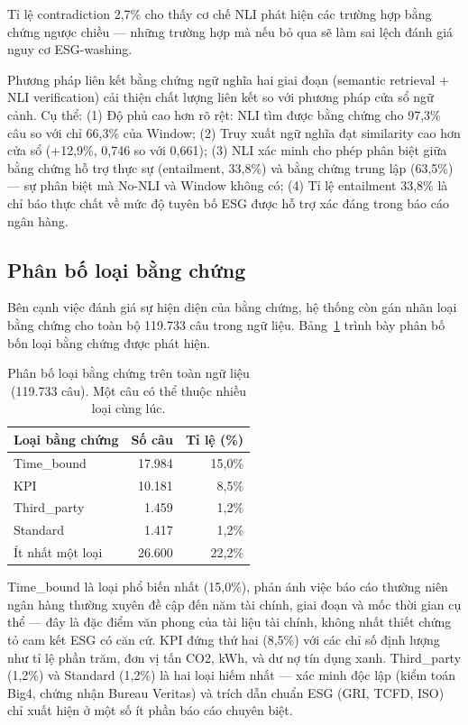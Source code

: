 Tỉ lệ contradiction 2,7\% cho thấy cơ chế NLI phát hiện các trường hợp bằng chứng ngược chiều --- những trường hợp mà nếu bỏ qua sẽ làm sai lệch đánh giá nguy cơ ESG-washing.

Phương pháp liên kết bằng chứng ngữ nghĩa hai giai đoạn (semantic retrieval + NLI verification) cải thiện chất lượng liên kết so với phương pháp cửa sổ ngữ cảnh. Cụ thể: (1) Độ phủ cao hơn rõ rệt: NLI tìm được bằng chứng cho 97,3\% câu so với chỉ 66,3\% của Window; (2) Truy xuất ngữ nghĩa đạt similarity cao hơn cửa sổ (+12,9\%, 0,746 so với 0,661); (3) NLI xác minh cho phép phân biệt giữa bằng chứng hỗ trợ thực sự (entailment, 33,8\%) và bằng chứng trung lập (63,5\%) --- sự phân biệt mà No-NLI và Window không có; (4) Tỉ lệ entailment 33,8\% là chỉ báo thực chất về mức độ tuyên bố ESG được hỗ trợ xác đáng trong báo cáo ngân hàng.

\subsection{Phân bố loại bằng chứng}
\label{subsec:evidence_type_dist}

Bên cạnh việc đánh giá sự hiện diện của bằng chứng, hệ thống còn gán nhãn loại bằng chứng cho toàn bộ 119.733 câu trong ngữ liệu. Bảng~\ref{tab:evidence_type_dist} trình bày phân bố bốn loại bằng chứng được phát hiện.

\begin{table}[H]
\centering
\caption{Phân bố loại bằng chứng trên toàn ngữ liệu (119.733 câu). Một câu có thể thuộc nhiều loại cùng lúc.}
\label{tab:evidence_type_dist}
\small
\begin{tabular}{lrr}
\toprule
\textbf{Loại bằng chứng} & \textbf{Số câu} & \textbf{Tỉ lệ (\%)} \\
\midrule
Time\_bound  & 17.984 & 15,0\% \\
KPI          & 10.181 &  8,5\% \\
Third\_party &  1.459 &  1,2\% \\
Standard     &  1.417 &  1,2\% \\
\midrule
Ít nhất một loại & 26.600 & 22,2\% \\
\bottomrule
\end{tabular}
\end{table}

Time\_bound là loại phổ biến nhất (15,0\%), phản ánh việc báo cáo thường niên ngân hàng thường xuyên đề cập đến năm tài chính, giai đoạn và mốc thời gian cụ thể --- đây là đặc điểm văn phong của tài liệu tài chính, không nhất thiết chứng tỏ cam kết ESG có căn cứ. KPI đứng thứ hai (8,5\%) với các chỉ số định lượng như tỉ lệ phần trăm, đơn vị tấn CO2, kWh, và dư nợ tín dụng xanh. Third\_party (1,2\%) và Standard (1,2\%) là hai loại hiếm nhất --- xác minh độc lập (kiểm toán Big4, chứng nhận Bureau Veritas) và trích dẫn chuẩn ESG (GRI, TCFD, ISO) chỉ xuất hiện ở một số ít phần báo cáo chuyên biệt.

